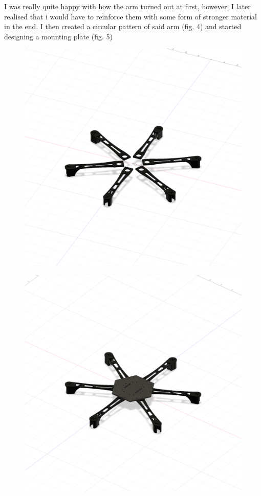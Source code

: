 \documentclass{hitec}
\begin{document}
I was really quite happy with how the arm turned out at first, however, I later realised that i would have to reinforce them with some form of stronger material in the end.
I then created a circular pattern of said arm (fig. 4) and started designing a mounting plate (fig. 5) 
\begin{figure}[h]
	\centering
	\begin{minipage}{.5\textwidth}
		\centering
		\includegraphics[width=.9\linewidth]{arms}
		\label{fig:arms}
	\end{minipage}%
	\begin{minipage}{.5\textwidth}
		\centering
		\includegraphics[width=.9\linewidth]{plate}
		\label{fig:plate}
	\end{minipage}
\end{figure}\newline
\end{document}
